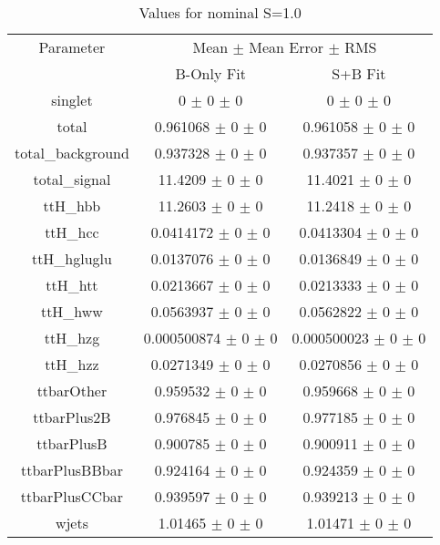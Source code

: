 \begin{table}
\centering
\caption{Values for nominal S=1.0}
\begin{tabular}{ccc}
\toprule
Parameter 	& \multicolumn{2}{c}{Mean $\pm$ Mean Error $\pm$ RMS}\\
 	& B-Only Fit & S+B Fit\\
\midrule
singlet 	& \num{0} $\pm$ \num{0} $\pm$ \num{0} 	& \num{0} $\pm$ \num{0} $\pm$ \num{0}\\
total 	& \num{0.961068} $\pm$ \num{0} $\pm$ \num{0} 	& \num{0.961058} $\pm$ \num{0} $\pm$ \num{0}\\
total\_background 	& \num{0.937328} $\pm$ \num{0} $\pm$ \num{0} 	& \num{0.937357} $\pm$ \num{0} $\pm$ \num{0}\\
total\_signal 	& \num{11.4209} $\pm$ \num{0} $\pm$ \num{0} 	& \num{11.4021} $\pm$ \num{0} $\pm$ \num{0}\\
ttH\_hbb 	& \num{11.2603} $\pm$ \num{0} $\pm$ \num{0} 	& \num{11.2418} $\pm$ \num{0} $\pm$ \num{0}\\
ttH\_hcc 	& \num{0.0414172} $\pm$ \num{0} $\pm$ \num{0} 	& \num{0.0413304} $\pm$ \num{0} $\pm$ \num{0}\\
ttH\_hgluglu 	& \num{0.0137076} $\pm$ \num{0} $\pm$ \num{0} 	& \num{0.0136849} $\pm$ \num{0} $\pm$ \num{0}\\
ttH\_htt 	& \num{0.0213667} $\pm$ \num{0} $\pm$ \num{0} 	& \num{0.0213333} $\pm$ \num{0} $\pm$ \num{0}\\
ttH\_hww 	& \num{0.0563937} $\pm$ \num{0} $\pm$ \num{0} 	& \num{0.0562822} $\pm$ \num{0} $\pm$ \num{0}\\
ttH\_hzg 	& \num{0.000500874} $\pm$ \num{0} $\pm$ \num{0} 	& \num{0.000500023} $\pm$ \num{0} $\pm$ \num{0}\\
ttH\_hzz 	& \num{0.0271349} $\pm$ \num{0} $\pm$ \num{0} 	& \num{0.0270856} $\pm$ \num{0} $\pm$ \num{0}\\
ttbarOther 	& \num{0.959532} $\pm$ \num{0} $\pm$ \num{0} 	& \num{0.959668} $\pm$ \num{0} $\pm$ \num{0}\\
ttbarPlus2B 	& \num{0.976845} $\pm$ \num{0} $\pm$ \num{0} 	& \num{0.977185} $\pm$ \num{0} $\pm$ \num{0}\\
ttbarPlusB 	& \num{0.900785} $\pm$ \num{0} $\pm$ \num{0} 	& \num{0.900911} $\pm$ \num{0} $\pm$ \num{0}\\
ttbarPlusBBbar 	& \num{0.924164} $\pm$ \num{0} $\pm$ \num{0} 	& \num{0.924359} $\pm$ \num{0} $\pm$ \num{0}\\
ttbarPlusCCbar 	& \num{0.939597} $\pm$ \num{0} $\pm$ \num{0} 	& \num{0.939213} $\pm$ \num{0} $\pm$ \num{0}\\
wjets 	& \num{1.01465} $\pm$ \num{0} $\pm$ \num{0} 	& \num{1.01471} $\pm$ \num{0} $\pm$ \num{0}\\
\bottomrule
\end{tabular}
\end{table}